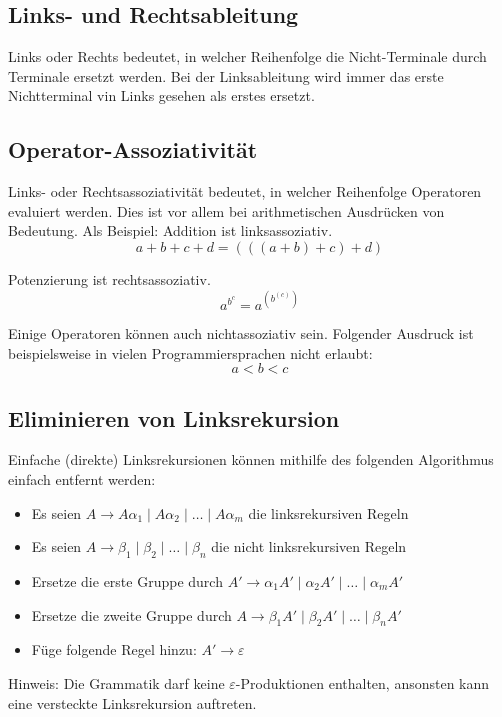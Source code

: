 \subsection{Links- und Rechtsableitung}

Links oder Rechts bedeutet, in welcher Reihenfolge die Nicht-Terminale durch
Terminale ersetzt werden. Bei der Linksableitung wird immer das erste
Nichtterminal vin Links gesehen als erstes ersetzt.


\subsection{Operator-Assoziativität}

Links- oder Rechtsassoziativität bedeutet, in welcher Reihenfolge Operatoren
evaluiert werden.  Dies ist vor allem bei arithmetischen Ausdrücken von
Bedeutung. Als Beispiel: Addition ist linksassoziativ.
\[
	a + b + c + d = (((a + b) + c) + d)
\]

Potenzierung ist rechtsassoziativ.
\[
	a^{b^c} = a^{(b^{(c)})}
\]

Einige Operatoren können auch nichtassoziativ sein. Folgender Ausdruck ist
beispielsweise in vielen Programmiersprachen nicht erlaubt:
\[
	a < b < c
\]


\subsection{Eliminieren von Linksrekursion}

Einfache (direkte) Linksrekursionen können mithilfe des folgenden Algorithmus einfach entfernt
werden:

\begin{itemize}
	\item Es seien $A \rightarrow A\alpha_1 \mid A\alpha_2 \mid \ldots \mid A\alpha_m$ die
		linksrekursiven Regeln
	\item Es seien $A \rightarrow \beta_1 \mid \beta_2 \mid \ldots \mid \beta_n$ die nicht
		linksrekursiven Regeln
	\item Ersetze die erste Gruppe durch $A' \rightarrow \alpha_1A'\mid \alpha_2A' \mid \ldots \mid
		\alpha_mA'$
	\item Ersetze die zweite Gruppe durch $A \rightarrow \beta_1A' \mid \beta_2A' \mid \ldots \mid
		\beta_nA'$
	\item Füge folgende Regel hinzu: $A' \rightarrow \varepsilon$
\end{itemize}

Hinweis: Die Grammatik darf keine $\varepsilon$-Produktionen enthalten, ansonsten kann eine
versteckte Linksrekursion auftreten.


